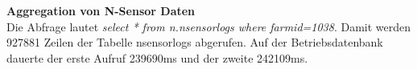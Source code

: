 \label{appendix-A}
\textbf{Aggregation von N-Sensor Daten}\\
Die Abfrage lautet \textit{select * from n.nsensorlogs where farmid=1038}.
Damit werden 927881 Zeilen der Tabelle nsensorlogs abgerufen.
Auf der Betriebsdatenbank dauerte der erste Aufruf 239690ms und der zweite 242109ms.

